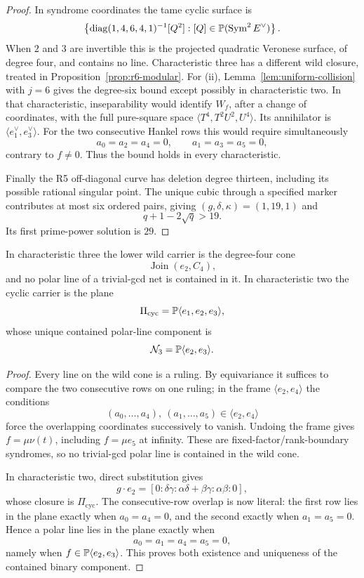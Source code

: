 \begin{proof}
In syndrome coordinates the tame cyclic surface is
\[
\left\{\operatorname{diag}(1,4,6,4,1)^{-1}[Q^2]:
[Q]\in\mathbb P(\operatorname{Sym}^2E^\vee)\right\}.
\]
When $2$ and $3$ are invertible this is the projected quadratic
Veronese surface, of degree four, and contains no line.
Characteristic three has a different
wild closure, treated in Proposition~\ref{prop:r6-modular}.
For (ii), Lemma~\ref{lem:uniform-collision} with \(j=6\) gives the
degree-six bound except possibly in characteristic two.  In that
characteristic, inseparability would identify \(W_f\), after a change
of coordinates, with the full pure-square space
\(\langle T^4,T^2U^2,U^4\rangle\).  Its annihilator is
\(\langle e_1^\vee,e_3^\vee\rangle\).  For the two consecutive Hankel
rows this would require simultaneously
\[
 a_0=a_2=a_4=0,\qquad a_1=a_3=a_5=0,
\]
contrary to \(f\ne0\).  Thus the bound holds in every characteristic.

Finally the R5 off-diagonal curve has deletion degree thirteen,
including its possible rational singular point.  The unique cubic
through a specified marker contributes at most six ordered pairs,
giving $(g,\delta,\kappa)=(1,19,1)$ and
\[
       q+1-2\sqrt q>19.
\]
Its first prime-power solution is $29$.
\end{proof}

\begin{proposition}\label{prop:r6-modular}%
%
%
In characteristic three the lower wild carrier is the degree-four cone
\[
       \operatorname{Join}(e_2,C_4),
\]
and no polar line of a trivial-gcd net is contained in it.  In
characteristic two the cyclic carrier is the plane
\[
       \Pi_{\mathrm{cyc}}=\mathbb P\langle e_1,e_2,e_3\rangle,
\]
whose unique contained polar-line component is
\[
       \mathcal N_3=\mathbb P\langle e_2,e_3\rangle.
\]
\end{proposition}

\begin{proof}
Every line on the wild cone is a ruling.  By equivariance it suffices
to compare the two consecutive rows on one ruling; in the frame
$\langle e_2,e_4\rangle$ the conditions
\[
(a_0,\ldots,a_4),\ (a_1,\ldots,a_5)\in\langle e_2,e_4\rangle
\]
force the overlapping coordinates successively to vanish.  Undoing
the frame gives $f=\mu\nu(t)$, including $f=\mu e_5$ at infinity.
These are fixed-factor/rank-boundary syndromes, so no trivial-gcd
polar line is contained in the wild cone.

In characteristic two, direct substitution gives
\[
g\cdot e_2=
[0:\delta\gamma:\alpha\delta+\beta\gamma:\alpha\beta:0],
\]
whose closure is $\Pi_{\mathrm{cyc}}$.  The consecutive-row overlap
is now literal: the first row lies in the plane exactly when
$a_0=a_4=0$, and the second exactly when $a_1=a_5=0$.  Hence a polar
line lies in the plane exactly when
\[
a_0=a_1=a_4=a_5=0,
\]
namely when $f\in\mathbb P\langle e_2,e_3\rangle$.  This proves both
existence and uniqueness of the contained binary component.
\end{proof}

